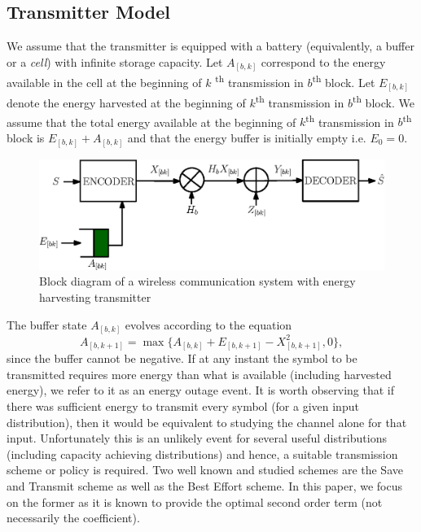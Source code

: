 \documentclass[conference]{IEEEtran}
\begin{document}
\subsection{Transmitter Model}\label{Txmod}
We assume that the transmitter is equipped with a battery (equivalently, a buffer or a \emph{cell}) with infinite storage capacity. Let $A_{[b,k]}$ correspond to the energy available in the cell at the beginning of $k$ \textsuperscript{th} transmission in $b$\textsuperscript{th} block. Let $E_{[b,k]}$ denote the energy harvested at the beginning of $k$\textsuperscript{th} transmission in $b$\textsuperscript{th} block. We assume that the total energy available at the beginning of $k$\textsuperscript{th} transmission in $b$\textsuperscript{th} block is $E_{[b,k]}+A_{[b,k]}$ and that the energy buffer is initially empty i.e. $E_0 = 0$. 
\begin{figure}[h]
\includegraphics[scale=.6]{Schematic_BlockFade_EHTx.eps}
\caption{Block diagram of a wireless communication system with energy harvesting transmitter}
\label{Fig_Schematic}
\end{figure}

The buffer state $A_{[b,k]}$ evolves according to the equation
\begin{equation}
	A_{[b,k+1]} = \max\{A_{[b,k]} + E_{[b,k+1]} - X^2_{[b,k+1]}, 0 \},
\end{equation}
since the buffer cannot be negative. If at any instant the symbol to be transmitted requires more energy than what is available (including harvested energy), we refer to it as an energy outage event. It is worth observing that if there was sufficient energy to transmit every symbol (for a given input distribution), then it would be equivalent to studying the channel alone for that input. Unfortunately this is an unlikely event for several useful distributions (including capacity achieving distributions) and hence, a suitable transmission scheme or policy is required. Two well known and studied schemes are the Save and Transmit scheme as well as the Best Effort scheme. In this paper, we focus on the former as it is known to provide the optimal second order term (not necessarily the coefficient). 
\end{document}
